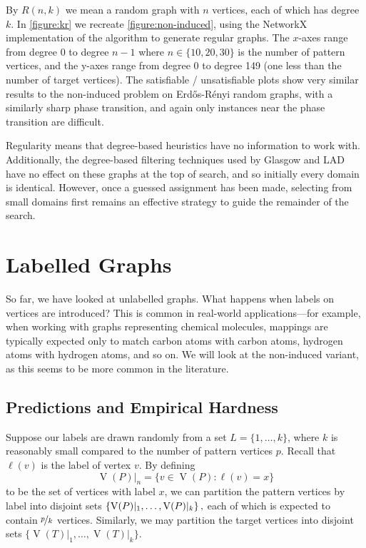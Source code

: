 \documentclass[twoside,11pt]{article}
\newcommand{\citet}[1]{\citeA{#1}}
\newcommand{\citep}[1]{\cite{#1}}
\begin{document}
By $R(n, k)$ we mean a random graph with $n$ vertices, each of which has degree $k$. In
\cref{figure:kr} we recreate \cref{figure:non-induced}, using the NetworkX implementation
\citep{o:NetworkX} of the \citet{DBLP:journals/cpc/StegerW99} algorithm to generate regular graphs.
The $x$-axes range from degree 0 to degree $n - 1$ where $n \in \{ 10, 20, 30 \}$ is the number of
pattern vertices, and the y-axes range from degree 0 to degree
149 (one less than the number of target vertices).  The satisfiable / unsatisfiable plots show very
similar results to the non-induced problem on Erd\H{o}s-R\'enyi random graphs, with a similarly
sharp phase transition, and again only instances near the phase transition are difficult.

Regularity means that degree-based heuristics have no information to work with. Additionally, the
degree-based filtering techniques used by Glasgow and LAD have no effect on these graphs at the top
of search, and so initially every domain is identical. However, once a guessed assignment has been
made, selecting from small domains first remains an effective strategy to guide the remainder of the
search.

\section{Labelled Graphs}\label{section:labelled}

So far, we have looked at unlabelled graphs. What happens when labels on vertices are introduced?
This is common in real-world applications---for example, when working with graphs representing
chemical molecules, mappings are typically expected only to match carbon atoms with carbon atoms,
hydrogen atoms with hydrogen atoms, and so on.  We will look at the non-induced variant, as this
seems to be more common in the literature.

\subsection{Predictions and Empirical Hardness}

Suppose our labels are drawn randomly from a set $L = \{ 1, \ldots, k \}$, where $k$ is reasonably
small compared to the number of pattern vertices $p$. Recall that $\ell(v)$ is the label of vertex
$v$. By defining \[ \operatorname{V}(P)\vert_n = \{ v \in \operatorname{V}(P) : \ell(v) = x \} \] to
be the set of vertices with label $x$, we can partition the pattern vertices by label into disjoint
sets $\{\operatorname{V}(P)\vert_1, \ldots, \operatorname{V}(P)\vert_k \}\textnormal{\,,}$ each of
which is expected to contain $\nicefrac{p}{k}$ vertices. Similarly, we may partition the target
vertices into disjoint sets $\{ \operatorname{V}(T)\vert_1, \ldots, \operatorname{V}(T)\vert_k \}$.
\end{document}
